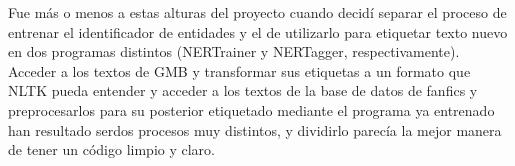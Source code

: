 \documentclass{pre-tfg}
\begin{document}
Fue más o menos a estas alturas del proyecto cuando decidí separar el proceso de entrenar el identificador de entidades y el de utilizarlo para etiquetar texto nuevo en dos programas distintos (NERTrainer y NERTagger, respectivamente). Acceder a los textos de GMB y transformar sus etiquetas a un formato que NLTK pueda entender y acceder a los textos de la base de datos de fanfics y preprocesarlos para su posterior etiquetado mediante el programa ya entrenado han resultado serdos procesos muy distintos, y dividirlo parecía la mejor manera de tener un código limpio y claro.


\end{document}
